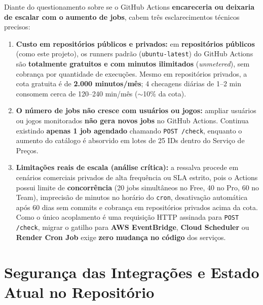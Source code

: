 \documentclass[11pt,a4paper]{article}
\begin{document}
Diante do questionamento sobre se o GitHub Actions \textbf{encareceria ou deixaria de escalar com o aumento de jobs}, cabem três esclarecimentos técnicos precisos:
\begin{enumerate}
    \item \textbf{Custo em repositórios públicos e privados:} em \textbf{repositórios públicos} (como este projeto), os runners padrão (\texttt{ubuntu-latest}) do GitHub Actions são \textbf{totalmente gratuitos e com minutos ilimitados} (\textit{unmetered}), sem cobrança por quantidade de execuções. Mesmo em repositórios privados, a cota gratuita é de \textbf{2.000 minutos/mês}; 4 checagens diárias de 1--2 min consomem cerca de 120--240 min/mês ($\sim$10\% da cota).
    \item \textbf{O número de jobs não cresce com usuários ou jogos:} ampliar usuários ou jogos monitorados \textbf{não gera novos jobs} no GitHub Actions. Continua existindo \textbf{apenas 1 job agendado} chamando \texttt{POST /check}, enquanto o aumento do catálogo é absorvido em lotes de 25 IDs dentro do Serviço de Preços.
    \item \textbf{Limitações reais de escala (análise crítica):} a ressalva procede em cenários comerciais privados de alta frequência ou SLA estrito, pois o Actions possui limite de \textbf{concorrência} (20 jobs simultâneos no Free, 40 no Pro, 60 no Team), imprecisão de minutos no horário do \texttt{cron}, desativação automática após 60 dias sem commits e cobrança em repositórios privados acima da cota. Como o único acoplamento é uma requisição HTTP assinada para \texttt{POST /check}, migrar o gatilho para \textbf{AWS EventBridge}, \textbf{Cloud Scheduler} ou \textbf{Render Cron Job} exige \textbf{zero mudança no código} dos serviços.
\end{enumerate}

\section{Segurança das Integrações e Estado Atual no Repositório}
\end{document}

